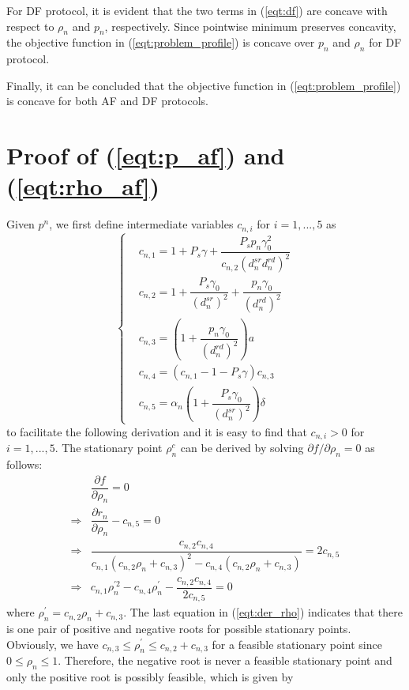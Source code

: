 \documentclass[12pt, draftclsnofoot, onecolumn]{IEEEtran}
\begin{document}
For DF protocol, it is evident that the two terms in (\ref{eqt:df}) are concave with respect to $\rho_{n}$ and $p_{n}$, respectively. Since pointwise minimum preserves concavity\cite{Boyd:2004:CO:993483}, the objective function in (\ref{eqt:problem_profile}) is concave over $p_{n}$ and $\rho_{n}$ for DF protocol.

Finally, it can be concluded that the objective function in (\ref{eqt:problem_profile}) is concave for both AF and DF protocols.



\section{Proof of (\ref{eqt:p_af}) and (\ref{eqt:rho_af})}\label{app:b}
Given $p^{n}$, we first define intermediate variables $c_{n,i}$ for $i=1,...,5$ as
\begin{equation}
\left\{
\begin{aligned}
&c_{n,1}=1+P_{s}\gamma+\dfrac{P_{s}p_{n}\gamma_{0}^{2}}{c_{n,2}(d^{sr}_{n}d^{rd}_{n})^{2}}\\
&c_{n,2}=1+\dfrac{P_{s}\gamma_{0}}{(d^{sr}_{n})^{2}}+\dfrac{p_{n}\gamma_{0}}{(d^{rd}_{n})^{2}}\\
&c_{n,3}=(1+\dfrac{p_{n}\gamma_{0}}{(d^{rd}_{n})^{2}})a\\
&c_{n,4}=(c_{n,1}-1-P_{s}\gamma)c_{n,3}\\
&c_{n,5}=\alpha_{n}(1+\dfrac{P_{s}\gamma_{0}}{(d^{sr}_{n})^{2}})\delta
\end{aligned}
\right.
\end{equation}
to facilitate the following derivation and it is easy to find that $c_{n,i}>0$ for $i=1,...,5$. The stationary point $\rho^{c}_{n}$ can be derived by solving $\partial f/\partial\rho_{n}=0$ as follows:
\begin{equation}\label{eqt:der_rho}
\begin{aligned}
&\dfrac{\partial f}{\partial\rho_{n}}=0\\
\Rightarrow &\dfrac{\partial r_{n}}{\partial\rho_{n}}-c_{n,5}=0\\
\Rightarrow &\dfrac{c_{n,2}c_{n,4}}{c_{n,1}(c_{n,2}\rho_{n}+c_{n,3})^{2}-c_{n,4}(c_{n,2}\rho_{n}+c_{n,3})}=2c_{n,5}\\
\Rightarrow &c_{n,1}\rho^{\prime 2}_{n}-c_{n,4}\rho^{\prime}_{n}-\dfrac{c_{n,2}c_{n,4}}{2c_{n,5}}=0
\end{aligned}
\end{equation}
where $\rho^{\prime}_{n}=c_{n,2}\rho_{n}+c_{n,3}$. The last equation in (\ref{eqt:der_rho}) indicates that there is one pair of positive and negative roots for possible stationary points. Obviously, we have $c_{n,3}\leq\rho^{\prime}_{n}\leq c_{n,2}+c_{n,3}$ for a feasible stationary point since $0\leq\rho_{n}\leq 1$. Therefore, the negative root is never a feasible stationary point and only the positive root is possibly feasible, which is given by
\end{document}
